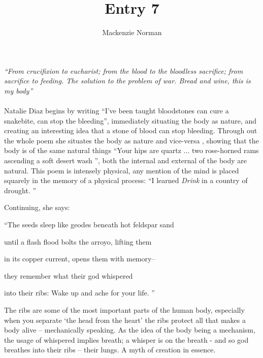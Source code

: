 \documentclass{article}
\title{Entry 7}
\author{Mackenzie Norman}
\begin{document}
\maketitle
\textit{``From crucifixion to eucharist; from the blood to the bloodless sacrifice; from sacrifice to feeding. The solution to the problem of war. Bread and wine, this is my body''}
\paragraph{}
 Natalie Diaz begins by writing ``I’ve been taught bloodstones can cure a snakebite,
can stop the bleeding'', immediately situating the body as nature, and creating an interesting idea that a stone of blood can stop bleeding. Through out the whole poem she situates the body as nature and vice-versa , showing that the body is of the same natural things ``Your hips are quartz ... two rose-horned rams ascending a soft desert wash '', both the internal and external of the body are natural. This poem is intensely physical, any mention of the mind is placed squarely in the memory of a physical process: ``I learned  \textit{Drink} in a country of drought. '' 

Continuing, she says:

``The seeds sleep like geodes beneath hot feldspar sand

until a flash flood bolts the arroyo, lifting them

in its copper current, opens them with memory–

they remember what their god whispered

into their ribs: Wake up and ache for your life. ''

The ribs are some of the most important parts of the human body, especially when you separate `the head from the heart' the ribs protect all that makes a body alive -- mechanically speaking. As the idea of the body being a mechanism, the usage of whispered implies breath; a whisper is on the breath - and so god breathes into their ribs -- their lungs. A myth of creation in essence. 
\end{document}
